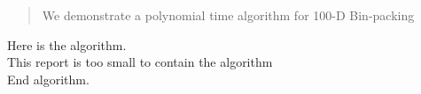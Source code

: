 \documentclass{article}
\begin{document}
\begin{abstract}
We demonstrate a polynomial time algorithm for 100-D Bin-packing
\end{abstract}

Here is the algorithm. \\
This report is too small to contain the algorithm \\
End algorithm. \\
\end{document}
